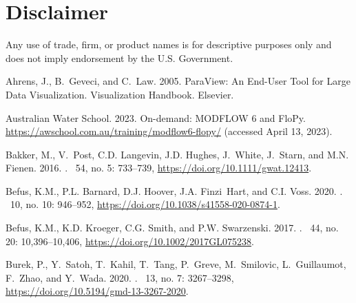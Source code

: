 \documentclass[12pt, oneside]{article}  	%
\begin{document}
\section*{Disclaimer}
Any use of trade, firm, or product names is for descriptive purposes only and does not imply endorsement by the U.S. Government.

\begin{thebibliography}{}

Ahrens, J., B.~Geveci, and C.~Law. 2005.
\newblock ParaView: An End-User Tool for Large Data Visualization.
\newblock Visualization Handbook. Elsevier.

{{Australian Water School}}. 2023.
\newblock On-demand: {MODFLOW 6 and FloPy}.
\newblock \url{https://awschool.com.au/training/modflow6-flopy/} (accessed
  April 13, 2023).

Bakker, M., V.~Post, C.D. Langevin, J.D. Hughes, J.~White, J.~Starn, and M.N.
  Fienen. 2016.
.
~54, no. 5: 733--739,
  \url{https://doi.org/10.1111/gwat.12413}.

Befus, K.M., P.L. Barnard, D.J. Hoover, J.A. Finzi~Hart, and C.I. Voss. 2020.
.
~10, no. 10: 946--952,
  \url{https://doi.org/10.1038/s41558-020-0874-1}.

Befus, K.M., K.D. Kroeger, C.G. Smith, and P.W. Swarzenski. 2017.
.
~44, no. 20: 10,396--10,406,
  \url{https://doi.org/10.1002/2017GL075238}.

Burek, P., Y.~Satoh, T.~Kahil, T.~Tang, P.~Greve, M.~Smilovic, L.~Guillaumot,
  F.~Zhao, and Y.~Wada. 2020.
.
~13, no. 7: 3267--3298,
  \url{https://doi.org/10.5194/gmd-13-3267-2020}.


\end{thebibliography}
\end{document}
